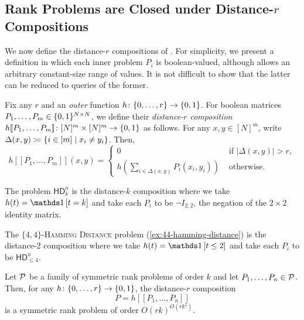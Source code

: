 \documentclass{article}
\newcommand{\HD}[1]{\mathsf{HD}_{#1}}
\begin{document}
\subsection{Rank Problems are Closed under Distance-\texorpdfstring{$r$}{r} Compositions}
\label{section:rank-closure-composition}

We now define the distance-$r$ compositions of \cite{FGHH25}. For simplicity, we
present a definition in which each inner problem $P_i$ is boolean-valued,
although \cite{FGHH25} allows an arbitrary constant-size range of values. It is
not difficult to show that the latter can be reduced to queries of the former.

\newcommand{\ldsbracket}{[\![}
\newcommand{\rdsbracket}{]\!]}
\begin{boxdefinition}
\label{def:distance-r-composition}
Fix any $r$ and an \emph{outer} function $h \colon \{0, \dotsc, r\} \to
\{0,1\}$. For boolean matrices $P_1, \dotsc, P_m \in \{0,1\}^{N \times N}$, we define their
\emph{distance-$r$ composition}
$h \ldsbracket P_1, \dotsc, P_m \rdsbracket \colon [N]^m \times [N]^m \to \zo$
as follows. For any $x,y \in [N]^m$, write $\Delta(x,y) \coloneqq \{ i \in [m] \;|\; x_i \neq y_i \}$. Then,
\[
    h\ldsbracket P_1, \dotsc, P_m \rdsbracket (x,y)
    = \begin{cases}
        0 &\text{ if } |\Delta(x,y)| > r, \\
        h\left(\sum_{i \in \Delta(x,y)} P_i(x_i, y_i) \right) &\text{ otherwise.}
    \end{cases}
\]
\end{boxdefinition}

\begin{example}
    The problem $\HD{k}^n$ is the distance-$k$ composition where we take $h(t) =\ind{t=k}$ and take each $P_i$ to be $\neg I_{2,2}$, the negation of the $2 \times 2$ identity matrix.
\end{example}

\begin{example}
    The \textsc{$\{4,4\}$-Hamming Distance} problem (\cref{ex:44-hamming-distance})
    is the distance-$2$ composition where we take $h(t) = \ind{t \leq 2}$
    and take each $P_i$ to be $\HD{\leq 4}^n$.
\end{example}

\begin{boxlemma}
\label{thm:rank-problem-composition}
Let $\mathcal{P}$ be a family of symmetric rank problems of order $k$ and let $P_1, \dotsc, P_n \in \mathcal{P}$. Then, for any $h \colon \{0, \dotsc, r\} \to \{0,1\}$, the distance-$r$ composition
\[
	P = h\ldsbracket P_1, \dotsc, P_n \rdsbracket
\]
is a symmetric rank problem of order $O(rk)^{O(rk^2)}$.
\end{boxlemma}
\end{document}
